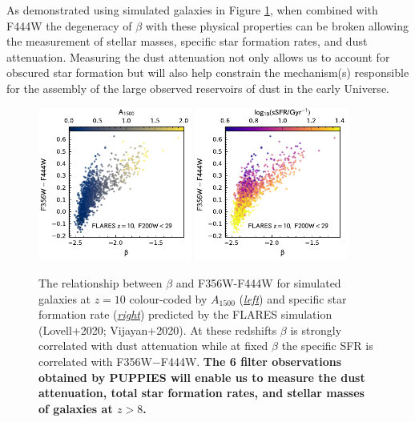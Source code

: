 \documentclass[12pt]{article}
\begin{document}
As demonstrated using simulated galaxies in Figure \ref{fig:beta}, when combined with F444W the degeneracy of $\beta$ with these physical properties can be broken allowing the measurement of stellar masses, specific star formation rates, and dust attenuation. Measuring the dust attenuation not only allows us to account for obscured star formation but will also help constrain the mechanism(s) responsible for the assembly of the large observed reservoirs of dust in the early Universe.



\begin{figure}[h!]
    \centering
    \includegraphics[width=0.45\textwidth]{figs/beta_A1500.pdf}
    \includegraphics[width=0.45\textwidth]{figs/beta_sSFR.pdf}
    \caption{The relationship between $\beta$ and F356W-F444W for simulated galaxies at $z=10$ colour-coded by $A_{1500}$ (\emph{\underline{left}}) and specific star formation rate (\emph{\underline{right}}) predicted by the FLARES simulation (Lovell+2020; Vijayan+2020). At these redshifts $\beta$ is strongly correlated with dust attenuation while at fixed $\beta$ the specific SFR is correlated with F356W$-$F444W. \textbf{The 6 filter observations obtained by PUPPIES will enable us to measure the dust attenuation, total star formation rates, and stellar masses of galaxies at $z>8$.}}
    \label{fig:beta}
\end{figure}
\end{document}
